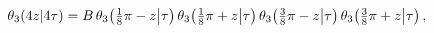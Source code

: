 \[\mathop{\theta_{3}\/}\nolimits\!\left(4z\middle|4\tau\right)=B\mathop{\theta_{%
3}\/}\nolimits\!\left(\tfrac{1}{8}\pi-z\middle|\tau\right)\mathop{\theta_{3}\/%
}\nolimits\!\left(\tfrac{1}{8}\pi+z\middle|\tau\right)\*\mathop{\theta_{3}\/}%
\nolimits\!\left(\tfrac{3}{8}\pi-z\middle|\tau\right)\mathop{\theta_{3}\/}%
\nolimits\!\left(\tfrac{3}{8}\pi+z\middle|\tau\right),\]